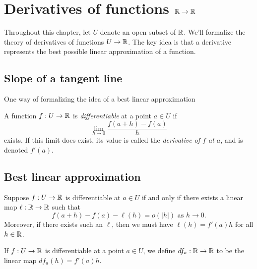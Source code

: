 \chapter{Derivatives of functions $\mathbb{R} \to \mathbb{R}$}

Throughout this chapter, let $U$ denote an open subset of $\mathbb{R}$. We'll formalize the theory of derivatives of functions $U \to \mathbb{R}$. The key idea is that a derivative represents the best possible linear approximation of a function.

\section{Slope of a tangent line}

One way of formalizing the idea of a best linear approximation 

\begin{definition}
	A function $f : U \to \mathbb{R}$ is \emph{differentiable} at a point $a \in U$ if 
	\[ \lim_{h \to 0} \frac{f(a+h) - f(a)}{h} \]
	exists. If this limit does exist, its value is called the \emph{derivative of $f$ at $a$}, and is denoted $f'(a)$. 
\end{definition}

\section{Best linear approximation}

\begin{proposition}
	Suppose $f : U \to \mathbb{R}$ is differentiable at $a \in U$ if and only if there exists a linear map $\ell : \mathbb{R} \to \mathbb{R}$ such that
	\[ f(a+h)-f(a) - \ell(h) = o(|h|) \text{ as } h \to 0. \]
	Moreover, if there exists such an $\ell$, then we must have $\ell(h) = f'(a)h$ for all $h \in \mathbb{R}$. 
\end{proposition}

\begin{definition}
	If $f : U \to \mathbb{R}$ is differentiable at a point $a \in U$, we define $df_a : \mathbb{R} \to \mathbb{R}$ to be the linear map $df_a(h) = f'(a)h$. 
\end{definition}